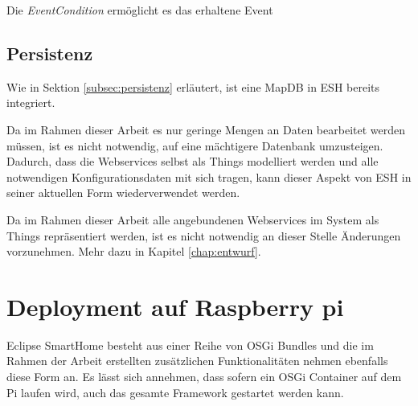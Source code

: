 Die \textit{EventCondition} ermöglicht es das erhaltene Event





\subsection{Persistenz}
Wie in Sektion \ref{subsec:persistenz} erläutert, ist eine MapDB in ESH bereits integriert. 


Da im Rahmen dieser Arbeit es nur geringe Mengen an Daten bearbeitet werden müssen, ist es nicht notwendig, auf eine mächtigere Datenbank umzusteigen. Dadurch, dass die Webservices selbst als Things modelliert werden und alle notwendigen Konfigurationsdaten mit sich tragen, kann dieser Aspekt von ESH in seiner aktuellen Form wiederverwendet werden.


Da im Rahmen dieser Arbeit alle angebundenen Webservices im System als Things repräsentiert werden, ist es nicht notwendig an dieser Stelle Änderungen vorzunehmen. Mehr dazu in Kapitel \ref{chap:entwurf}.


\section{Deployment auf Raspberry pi}
Eclipse SmartHome besteht aus einer Reihe von OSGi Bundles und die im Rahmen der Arbeit erstellten zusätzlichen Funktionalitäten nehmen ebenfalls diese Form an. Es lässt sich annehmen, dass sofern ein OSGi Container auf dem Pi laufen wird, auch das gesamte Framework gestartet werden kann.

